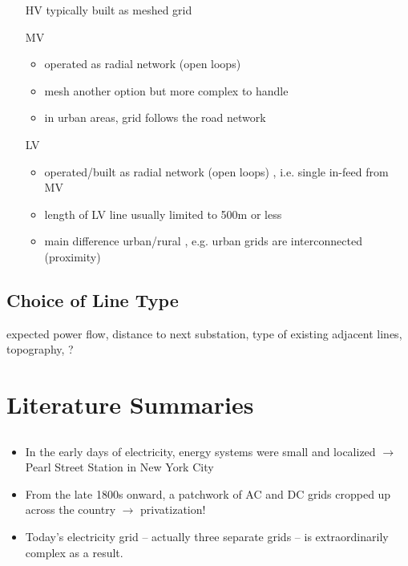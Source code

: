 \documentclass[paper=a4, fontsize=12pt]{article}
\begin{document}
\begin{itemize}
\item[HV] typically built as meshed grid \cite[p.15]{Lakervi1995}
\item[MV] 
\begin{itemize}
\item operated as radial network (open loops) \cite[p.17]{Lakervi1995}
\item mesh another option but more complex to handle \cite[p.176]{Lakervi1995}
\item in urban areas, grid follows the road network \cite[p.181]{Lakervi1995}
\end{itemize}
\item[LV] 
\begin{itemize}
\item operated/built as radial network (open loops) \cite[p.192]{Lakervi1995}, i.e. single in-feed from MV
\item length of LV line usually limited to 500m or less \cite[p.12]{Lakervi1995}
\item main difference urban/rural \cite[p.194ff.]{Lakervi1995}, e.g. urban grids are interconnected (proximity)
\end{itemize} 
\end{itemize}

\subsection*{Choice of Line Type}

expected power flow, distance to next substation, type of existing adjacent lines, topography, ?

\section{Literature Summaries}

\subsection*{\citeauthor{BURN} \cite{BURN}}

\begin{itemize}
\item In the early days of electricity, energy systems were small and localized $\rightarrow$ Pearl Street Station in New York City
\item From the late 1800s onward, a patchwork of AC and DC grids cropped up across the country $\rightarrow$ privatization!
\item Today’s electricity grid -- actually three separate grids -- is extraordinarily complex as a result.
\end{itemize}
\end{document}
